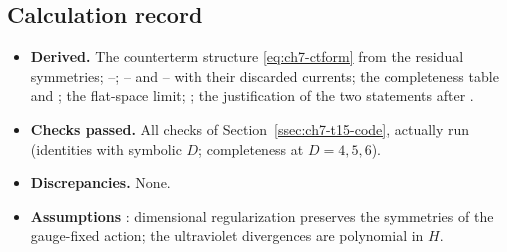 \subsection{Calculation record}
\begin{itemize}[leftmargin=14pt]
\item \textbf{Derived.} The counterterm structure \eqref{eq:ch7-ctform} from the residual symmetries; --; -- and -- with their discarded currents;
the completeness table and ; the flat-space limit; ; the justification of the two statements after .
\item \textbf{Checks passed.} All checks of Section~\ref{ssec:ch7-t15-code}, actually run (identities with symbolic $D$; completeness at $D=4,5,6$).
\item \textbf{Discrepancies.} None.
\item \textbf{Assumptions} \tA: dimensional regularization preserves the symmetries of the gauge-fixed action; the ultraviolet divergences are polynomial in $H$.
\end{itemize}
